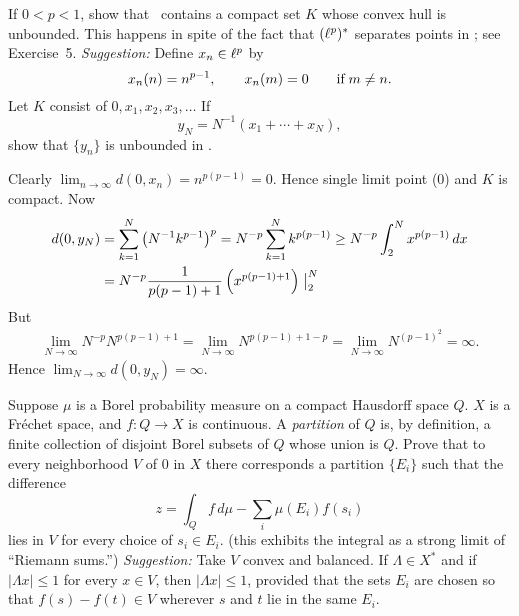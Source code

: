 \begin{enumerate}
\begin{excopy}
If \(0<p<1\), show that \ellp\ contains a compact set $K$ whose convex hull is
unbounded. This happens in spite of the fact that \((\ell^p)^*\)
separates points in \ellp; see Exercise~5.
\emph{Suggestion:} Define \(x_n \in \ell^p\) by
\begin{equation*}
x_n(n) = n^{p-1}, \qquad x_n(m) = 0 \qquad \textnormal{if}\; m\neq n.
\end{equation*}
Let $K$ consist of \(0, x_1, x_2, x_3,\dots\) If
\begin{equation*}
y_N = N^{-1}(x_1 + \cdots + x_N),
\end{equation*}
show that \(\{y_n\}\) is unbounded in \ellp.
\end{excopy}

Clearly \(\lim_{n\to\infty} d(0,x_n) = n^{p(p-1)} = 0\).
Hence single limit point ($0$) and $K$ is compact.
Now
\begin{align*}
d(0,y_N) 
&= \sum_{k=1}^N \left(N^{-1} k^{p-1}\right)^p
 = N^{-p} \sum_{k=1}^N  k^{p(p-1)}
 \geq N^{-p} \int_2^N x^{p(p-1)}\,dx \\
&= N^{-p} \frac{1}{p(p-1)+1}\left(x^{p(p-1)+1}\right)\bigm|_2^N
\end{align*}
But
\begin{align*}
\lim_{N\to\infty} N^{-p}N^{p(p-1)+1}
= \lim_{N\to\infty} N^{p(p-1)+1-p}
= \lim_{N\to\infty} N^{(p-1)^2} = \infty.
\end{align*}
Hence \(\lim_{N\to\infty} d(0,y_N) = \infty\).


\begin{excopy}
Suppose \(\mu\) is a Borel probability measure on a compact Hausdorff
space $Q$. $X$ is a Fr\'echet space, and \(f:Q\to X\) is continuous.
A \emph{partition} of $Q$ is, by definition, a finite collection of disjoint
Borel subsets of $Q$ whose union is $Q$. Prove that to every neighborhood
$V$ of $0$ in $X$ there corresponds a partition \(\{E_i\}\) such that the
difference
\begin{equation*}
z = \int_Q f\,d\mu - \sum_i \mu(E_i)f(s_i)
\end{equation*}
lies in $V$ for every choice of \(s_i \in E_i\).
(this exhibits the integral as a strong limit of ``Riemann sums.'')
\emph{Suggestion:} Take $V$ convex and balanced.
If \(\Lambda \in X^*\) and if \(|\Lambda x| \leq 1\) for every \(x \in V\),
then \(|\Lambda x| \leq 1\), provided that the sets \(E_i\) are chosen so
that \(f(s) - f(t) \in V\) wherever $s$ and $t$ lie in the same \(E_i\).
\end{excopy}


\end{enumerate}
